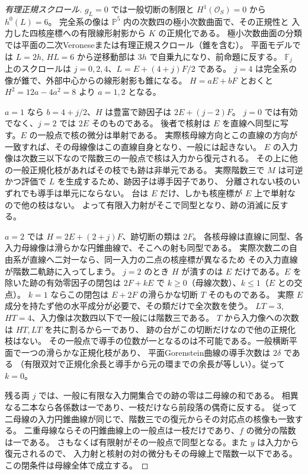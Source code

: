 \begin{proof}[有理正規スクロール]
$g_L=0$ では一般切断の制限と $H^1(\mathcal O_S)=0$ から $h^0(L)=6$。
完全系の像は $\mathbb P^5$ 内の次数四の極小次数曲面で、その正規性と
入力した四核座標への有限線形射影から $K$ の正規化である。
極小次数曲面の分類では平面の二次Veroneseまたは有理正規スクロール（錐を含む）。
平面モデルでは $L=2h$, $HL=6$ から逆移動部は $3h$ で自乗九になり、前命題に反する。
$\mathbb F_j$ 上のスクロールは $j=0,2,4$、$L=E+(4+j)F/2$ である。
$j=4$ は完全系の像が錐で、外部中心からの線形射影も錐になる。
$H=aE+bF$ とおくと $H^2=12a-4a^2=8$ より $a=1,2$ となる。

$a=1$ なら $b=4+j/2$、$H$ は豊富で跡因子は $2E+(j-2)F$。
$j=0$ では有効でなく、$j=2$ では $2E$ そのものである。
後者で核射は $E$ を直線へ同型に写す。$E$ の一般点で核の微分は単射である。
実際核母線方向とこの直線の方向が一致すれば、その母線像はこの直線自身となり、一般には起きない。
$E$ の入力像は次数三以下なので階数三の一般点で核は入力から復元される。
その上に他の一般正規化枝があればその枝でも跡は非単元である。
実際階数三で $M$ は可逆かつ評価で $L$ を生成するため、跡因子は導手因子であり、
分離されない枝のいずれでも導手は単元にならない。
台は $E$ だけ、しかも核座標が $E$ 上で単射なので他の枝はない。
よって有限入力射がそこで同型となり、跡の消滅に反する。

$a=2$ では $H=2E+(2+j)F$、跡切断の類は $2F$。
各核母線は直線に同型、各入力母線像は滑らかな円錐曲線で、そこへの射も同型である。
実際次数二の自由系が直線へ二対一なら、同一入力の二点の核座標が異なるため
その入力直線が階数二軌跡に入ってしまう。
$j=2$ のとき $H$ が潰すのは $E$ だけである。$E$ を除いた跡の有効零因子の閉包は
$2F+kE$ で $k\ge0$（母線次数）、$k\le1$（$E$ との交点）。
$k=1$ ならこの閉包は $E+2F$ の滑らかな切断 $T$ そのものである。
実際 $E$ 成分を持たず他の水平成分が必要で、その類だけで全次数を使う。
$LT=3$, $HT=4$、入力像は次数四以下で一般には階数三である。
$T$ から入力像への次数は $HT,LT$ を共に割るから一であり、
跡の台がこの切断だけなので他の正規化枝はない。
その一般点で導手の位数が一となるのは不可能である。一般横断平面で一つの滑らかな正規化枝があり、
平面Gorenstein曲線の導手次数は $2\delta$ である
（有限双対で正規化余長と導手から元の環までの余長が等しい）。従って $k=0$。

残る両 $j$ では、一般に有限な入力開集合での跡の零は二母線の和である。
相異なる二本なら各係数は一であり、一枝だけなら前段落の偶奇に反する。
従って二母線の入力円錐曲線が同じで、階数三での復元からその対応点の核像も一致する。
二重母線ならその円錐曲線上の一般点は一枝だけであり、$f$ の微分の階数は一である。
さもなくば有限射がその一般点で同型となる。また $y$ は入力から復元されるので、
入力射と核射の対の微分もその母線上で階数一以下である。この閉条件は母線全体で成立する。


\end{proof}

